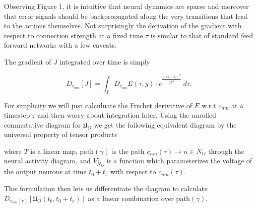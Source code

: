 Observing Figure 1, it is intuitive that neural dynamics are sparse and moreover that error signals should be backpropagated along the very transitions that lead to the actions themselves. Not surprisingly the derivation of the gradient with respect to connection strength at a fixed time $\tau$ is similar to that of standard feed forward networks with a few caveats. 

The gradient of $J$ integrated over time is simply

\begin{equation}
D_{c_{nm}} [J] = \int_I D_{c_{nm}}E(\tau, y)\cdot e^{\frac{-(t-t_0)^2}{|I|^2}}\ d\tau.
\end{equation}

For simplicity we will just calculuate the Frechet derivative of $E$ w.r.t $c_{nm}$ at a timestep $\tau$ and then worry about integration later. Using the unrolled commutative diagram for $\mathfrak{U}_O$ we get the following equivalent diagram by the universal property of tensor products
\begin{center}
	\end{center} 
	where $T$ is a linear map, $\text{path}(\gamma)$ is the path $c_{nm}(\tau) \to n \in N_O$ through the neural activity diagram, and $V_{N_O}^\gamma$ is a function which parameterizes the voltage of the output neurons at time $t_0 + t_e$ with respect to $c_{nm}(\tau)$. 

	This formulation then lets us differentiate the diagram to calculate $D_{c_{nm}(\tau)}\left[\mathfrak{U}_O(t_0,t_0+t_e)\right]$ as a linear combination over $\text{path}(\gamma).$

	\begin{center}
	\end{center}

